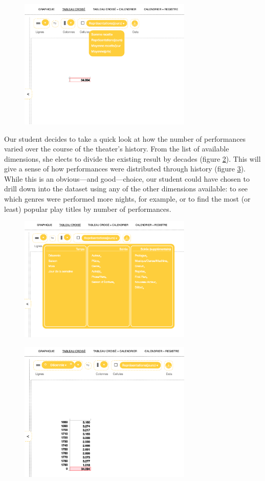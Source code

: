 \documentclass[	DIV=calc,%
							paper=a4,%
							fontsize=11pt,%
							twocolumn]{scrartcl}	 					%
\begin{document}
\begin{figure}
  \centering
	\includegraphics[width=3.25in]{steps/opening.png}
	\caption{}
	\label{fig:opening}
\end{figure}

Our student decides to take a quick look at how the number of performances varied over the course of the theater’s history.  From the list of available dimensions, she elects to divide the existing result by decades (figure \ref{fig:dimensions}).  This will give a sense of how performances were distributed through history (figure \ref{fig:performances_by_decade}).  While this is an obvious—and good—choice, our student could have chosen to drill down into the dataset using any of the other dimensions available: to see which genres were performed more nights, for example, or to find the most (or least) popular play titles by number of performances.

\begin{figure}
  \centering
	\includegraphics[width=3.25in]{steps/dimensions.png}
	\caption{}
	\label{fig:dimensions}
\end{figure}

\begin{figure}
  \centering
	\includegraphics[width=3.25in]{steps/performances_by_decade.png}
	\caption{}
	\label{fig:performances_by_decade}
\end{figure}
\end{document}
